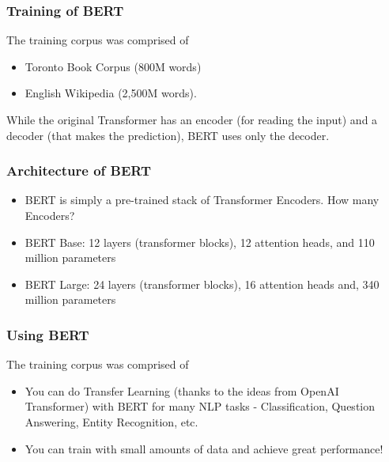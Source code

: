 \begin{frame}[fragile]\frametitle{Training of BERT}
The training corpus was comprised of

\begin{itemize}
\item  Toronto Book Corpus (800M words)
\item English Wikipedia (2,500M words). 
\end{itemize}

While the original Transformer has an encoder (for reading the input) and a decoder (that makes the prediction), BERT uses only the decoder.

\end{frame}

\begin{frame}[fragile]\frametitle{Architecture of BERT}

\begin{itemize}
\item  BERT is simply a pre-trained stack of Transformer Encoders. How many Encoders? 
\item BERT Base: 12 layers (transformer blocks), 12 attention heads, and 110 million parameters
\item BERT Large: 24 layers (transformer blocks), 16 attention heads and, 340 million parameters

\end{itemize}



\end{frame}

\begin{frame}[fragile]\frametitle{Using BERT}
The training corpus was comprised of

\begin{itemize}

\item You can do Transfer Learning (thanks to the ideas from OpenAI Transformer) with BERT for many NLP tasks - Classification, Question Answering, Entity Recognition, etc. 

\item You can train with small amounts of data and achieve great performance!
\end{itemize}

\end{frame}

